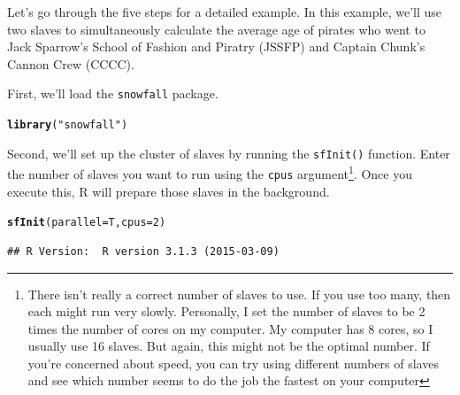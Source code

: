\documentclass{tufte-book}\usepackage[]{graphicx}\usepackage[]{color}
\makeatletter
\newcommand{\hlnum}[1]{\textcolor[rgb]{0.686,0.059,0.569}{#1}}%
\newcommand{\hlstr}[1]{\textcolor[rgb]{0.192,0.494,0.8}{#1}}%
\newcommand{\hlstd}[1]{\textcolor[rgb]{0.345,0.345,0.345}{#1}}%
\newcommand{\hlkwc}[1]{\textcolor[rgb]{0.333,0.667,0.333}{#1}}%
\newcommand{\hlkwd}[1]{\textcolor[rgb]{0.737,0.353,0.396}{\textbf{#1}}}%
\newenvironment{kframe}{%
 \def\at@end@of@kframe{}%
 \ifinner\ifhmode%
  \def\at@end@of@kframe{\end{minipage}}%
  \begin{minipage}{\columnwidth}%
 \fi\fi%
 \def\FrameCommand##1{\hskip\@totalleftmargin \hskip-\fboxsep
 \colorbox{shadecolor}{##1}\hskip-\fboxsep
     \hskip-\linewidth \hskip-\@totalleftmargin \hskip\columnwidth}%
 \MakeFramed {\advance\hsize-\width
   \@totalleftmargin\z@ \linewidth\hsize
   \@setminipage}}%
 {\par\unskip\endMakeFramed%
 \at@end@of@kframe}
\newenvironment{knitrout}{}{} %
\makeatother
\begin{document}
\begin{footnotesize}
\begin{enumerate}
\end{enumerate}

Let's go through the five steps for a detailed example. In this example, we'll use two slaves to simultaneously calculate the average age of pirates who went to Jack Sparrow's School of Fashion and Piratry (JSSFP) and Captain Chunk's Cannon Crew (CCCC).

First, we'll load the \texttt{snowfall} package.

\begin{knitrout}
\color{fgcolor}\begin{kframe}
\begin{alltt}
\hlkwd{library}\hlstd{(}\hlstr{"snowfall"}\hlstd{)}
\end{alltt}


{\ttfamily\noindent\itshape\color{messagecolor}{\#\# Loading required package: snow}}\end{kframe}
\end{knitrout}

Second, we'll set up the cluster of slaves by running the \texttt{sfInit()} function. Enter the number of slaves you want to run using the \texttt{cpus} argument\footnote{There isn't really a correct number of slaves to use. If you use too many, then each might run very slowly. Personally, I set the number of slaves to be 2 times the number of cores on my computer. My computer has 8 cores, so I usually use 16 slaves. But again, this might not be the optimal number. If you're concerned about speed, you can try using different numbers of slaves and see which number seems to do the job the fastest on your computer}. Once you execute this, R will prepare those slaves in the background.

\begin{knitrout}
\color{fgcolor}\begin{kframe}
\begin{alltt}
\hlkwd{sfInit}\hlstd{(}\hlkwc{parallel} \hlstd{= T,} \hlkwc{cpus} \hlstd{=} \hlnum{2}\hlstd{)}
\end{alltt}
\begin{verbatim}
## R Version:  R version 3.1.3 (2015-03-09)
\end{verbatim}


{\ttfamily\noindent\itshape\color{messagecolor}{\#\# snowfall 1.84-6 initialized (using snow 0.3-13): parallel execution on 2 CPUs.}}\end{kframe}
\end{knitrout}


\end{footnotesize}
\end{document}
